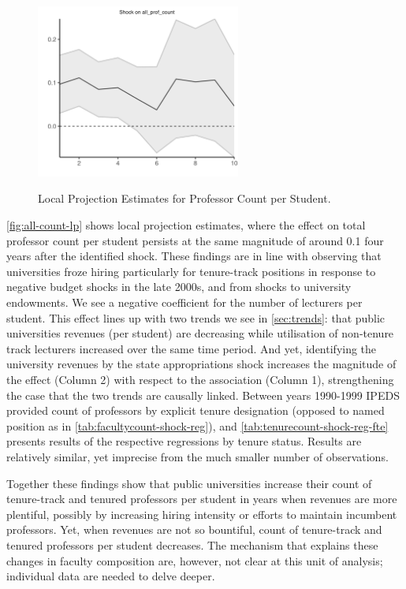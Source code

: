 \documentclass[notitlepage,12pt]{article}
\begin{document}
\begin{figure}[h!]
    \centering
    \singlespacing
    \caption{Local Projection Estimates for Professor Count per Student.}
    \includegraphics[width=0.6\textwidth]{figures/all-count-lp.png}
    \label{fig:all-count-lp}
\end{figure}
\autoref{fig:all-count-lp} shows local projection estimates, where the effect on total professor count per student persists at the same magnitude of around 0.1 four years after the identified shock.
These findings are in line with \cite{turner2014impact} observing that universities froze hiring particularly for tenure-track positions in response to negative budget shocks in the late 2000s, and \cite{brown2014endowment} from shocks to university endowments.
We see a negative coefficient for the number of lecturers per student.
This effect lines up with two trends we see in \autoref{sec:trends}: that public universities revenues (per student) are decreasing while utilisation of non-tenure track lecturers increased over the same time period.
And yet, identifying the university revenues by the state appropriations shock increases the magnitude of the effect (Column 2) with respect to the association (Column 1), strengthening the case that the two trends are causally linked.
Between years 1990-1999 IPEDS provided count of professors by explicit tenure designation (opposed to named position as in \autoref{tab:facultycount-shock-reg}), and \autoref{tab:tenurecount-shock-reg-fte} presents results of the respective regressions by tenure status.
Results are relatively similar, yet imprecise from the much smaller number of observations.

Together these findings show that public universities increase their count of tenure-track and tenured professors per student in years when revenues are more plentiful, possibly by increasing hiring intensity or efforts to maintain incumbent professors.
Yet, when revenues are not so bountiful, count of tenure-track and tenured professors per student decreases.
The mechanism that explains these changes in faculty composition are, however, not clear at this unit of analysis; individual data are needed to delve deeper.
\end{document}
